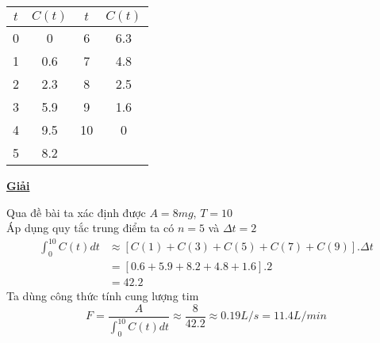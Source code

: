 \documentclass[12pt,a4paper]{article}
\begin{document}
\begin{enumerate}[a/]
\begin{flushleft}
\begin{table}[H]
			      \centering
			      \def\arraystretch{1.2}
			      \begin{tabular}{|c|c|c|c|}
				      \hline
				      $t$ & $C(t)$ & $t$ & $C(t)$ \\
				      \hline
				      0   & 0      & 6   & 6.3    \\
				      \hline
				      1   & 0.6    & 7   & 4.8    \\
				      \hline
				      2   & 2.3    & 8   & 2.5    \\
				      \hline
				      3   & 5.9    & 9   & 1.6    \\
				      \hline
				      4   & 9.5    & 10  & 0      \\
				      \hline
				      5   & 8.2    &     &        \\
				      \hline
			      \end{tabular}
		      \end{table}
	      \end{flushleft}
          \newpage
          \begin{center}
            \textbf{\underline{Giải}}
          \end{center}
          \begin{flushleft}
            Qua đề bài ta xác định được $A=8mg$, $T=10$\\
            \vspace{1em}
            Áp dụng quy tắc trung điểm ta có $n=5$ và $\Delta t=2$
            \begin{align*}
                \int_{0}^{10} C(t)dt &\approx \left[C(1)+C(3)+C(5)+C(7)+C(9)\right].\Delta t\\
                &=\left[0.6+5.9+8.2+4.8+1.6\right].2\\
                &=42.2
            \end{align*}
            Ta dùng công thức tính cung lượng tim
            $$F=\frac{A}{\displaystyle \int_{0}^{10} C(t)dt} \approx \frac{8}{42.2} \approx 0.19L/s=11.4L/min$$
          \end{flushleft}
\end{enumerate}

\newpage
{}
\end{document}
